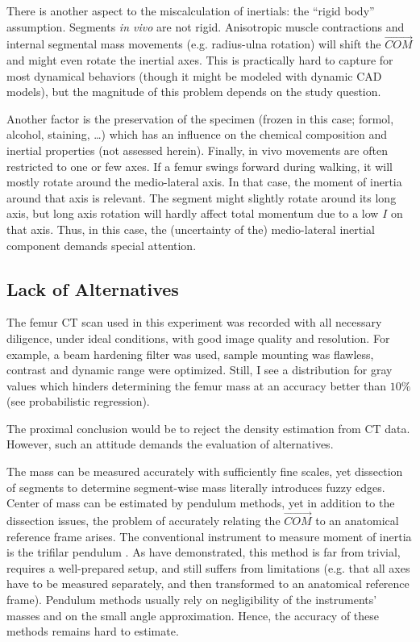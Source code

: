 There is another aspect to the miscalculation of inertials: the ``rigid body'' assumption.
Segments \emph{in vivo} are not rigid.
Anisotropic muscle contractions and internal segmental mass movements (e.g. radius-ulna rotation) will shift the \(\vec{COM}\) and might even rotate the inertial axes.
This is practically hard to capture for most dynamical behaviors (though it might be modeled with dynamic CAD models), but the magnitude of this problem depends on the study question.

Another factor is the preservation of the specimen (frozen in this case; formol, alcohol, staining, \ldots{}) which has an influence on the chemical composition and inertial properties (not assessed herein).
Finally, in vivo movements are often restricted to one or few axes.
If a femur swings forward during walking, it will mostly rotate around the medio-lateral axis.
In that case, the moment of inertia around that axis is relevant.
The segment might slightly rotate around its long axis, but long axis rotation will hardly affect total momentum due to a low \(I\) on that axis.
Thus, in this case, the (uncertainty of the) medio-lateral inertial component demands special attention.
\subsection{Lack of Alternatives}
\label{sec:org8c9a90d}
The femur CT scan used in this experiment was recorded with all necessary diligence, under ideal conditions, with good image quality and resolution.
For example, a beam hardening filter was used, sample mounting was flawless, contrast and dynamic range were optimized.
Still, I see a distribution for gray values which hinders determining the femur mass at an accuracy better than \(10 \%\) (see probabilistic regression).

The proximal conclusion would be to reject the density estimation from CT data.
However, such an attitude demands the evaluation of alternatives.



The mass can be measured accurately with sufficiently fine scales, yet dissection of segments to determine segment-wise mass literally introduces fuzzy edges.
Center of mass can be estimated by pendulum methods, yet in addition to the dissection issues, the problem of accurately relating the \(\vec{COM}\) to an anatomical reference frame arises.
The conventional instrument to measure moment of inertia is the trifilar pendulum \citep{Korr1962,Wells1987,Schedlinski2001}.
As \citet{Durston2022} have demonstrated, this method is far from trivial, requires a well-prepared setup, and still suffers from limitations (e.g. that all axes have to be measured separately, and then transformed to an anatomical reference frame).
Pendulum methods usually rely on negligibility of the instruments' masses and on the small angle approximation.
Hence, the accuracy of these methods remains hard to estimate.


